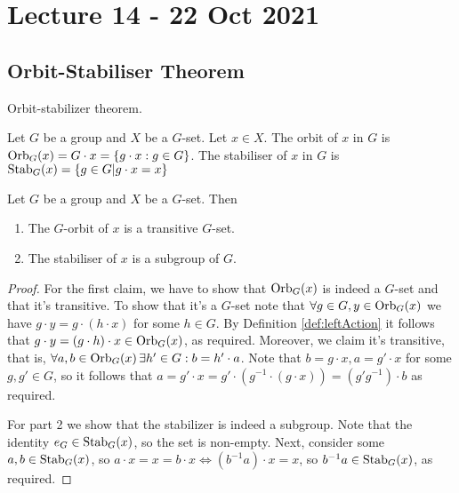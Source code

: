 \section{Lecture 14 - 22 Oct 2021}
\subsection{Orbit-Stabiliser Theorem}
Orbit-stabilizer theorem.
\begin{definition}
  Let $G$ be a group and $X$ be a $G$-set. Let $x\in X$. The orbit of $x$ in $G$ is
  $\operatorname*{Orb}_G (x)= G\cdot x = \left\{ g\cdot x :g\in G\right\}$.
  The stabiliser of $x$ in $G$ is $\operatorname*{Stab}_G (x)=\left\{ g\in G | g\cdot x=x \right\}$
  \label{def:orbStab}
\end{definition}


\begin{theorem}
  Let $G$ be a group and $X$ be a $G$-set. Then 
  \begin{enumerate}
    \item The $G$-orbit of $x$ is a transitive $G$-set.
    \item The stabiliser of $x$ is a subgroup of $G$.
  \end{enumerate}
  \label{<+label+>}
\end{theorem}
\begin{proof}
  For the first claim, we have to show that $\operatorname*{Orb}_G(x)$ is indeed a $G$-set and that it's
  transitive. To show that it's a $G$-set note that $\forall g\in G, y\in\operatorname*{Orb}_G(x)$ we
  have $g\cdot y = g\cdot (h\cdot x)$ for some $h\in G$. By Definition
  \ref{def:leftAction} it follows that $g\cdot y = (g\cdot h)\cdot x \in\operatorname*{Orb}_G(x)$, as
  required. Moreover, we claim it's transitive, that is, $\forall a,b\in\operatorname*{Orb}_G(x) \, \exists h'\in G : b=h'\cdot a$. Note that $b=g\cdot x, a=g'\cdot x$ for some $g,g'\in G$, so it
  follows that $a=g' \cdot x = g' \cdot (g^{-1} \cdot (g \cdot x)) = (g'g^{-1}) \cdot b$ as required.

  For part 2 we show that the stabilizer is indeed a subgroup. Note that the identity
  $e_G\in\operatorname*{Stab}_G(x)$, so the set is non-empty. Next, consider some $a,b\in\operatorname*{Stab}_G(x)$, so
  $a\cdot x=x=b\cdot x \iff (b^{-1}a)\cdot x =x$, so $b^{-1}a\in\operatorname*{Stab}_G(x)$, as required.
\end{proof}


